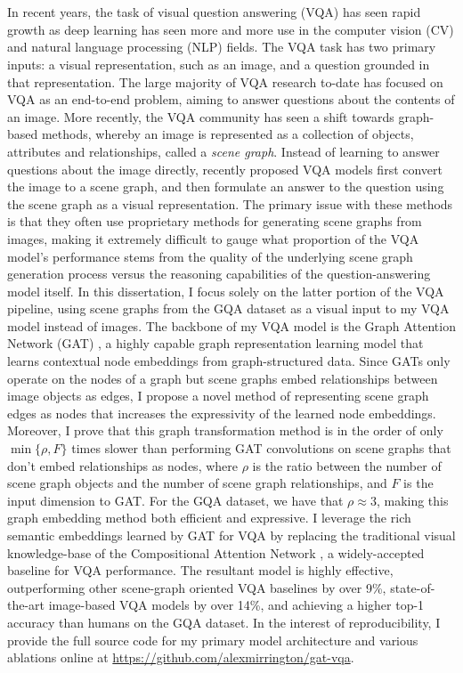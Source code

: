 \chapter*{}

In recent years, the task of visual question answering (VQA) has seen rapid growth as deep learning has seen more and more use in the computer vision (CV) and natural language processing (NLP) fields. The VQA task has two primary inputs: a visual representation, such as an image, and a question grounded in that representation. The large majority of VQA research to-date has focused on VQA as an end-to-end problem, aiming to answer questions about the contents of an image. More recently, the VQA community has seen a shift towards graph-based methods, whereby an image is represented as a collection of objects, attributes and relationships, called a \textit{scene graph}. Instead of learning to answer questions about the image directly, recently proposed VQA models first convert the image to a scene graph, and then formulate an answer to the question using the scene graph as a visual representation. The primary issue with these methods is that they often use proprietary methods for generating scene graphs from images, making it extremely difficult to gauge what proportion of the VQA model's performance stems from the quality of the underlying scene graph generation process versus the reasoning capabilities of the question-answering model itself. In this dissertation, I focus solely on the latter portion of the VQA pipeline, using scene graphs from the GQA dataset \cite{hudson2019gqa} as a visual input to my VQA model instead of images. The backbone of my VQA model is the Graph Attention Network (GAT) \cite{velivckovic2017graph}, a highly capable graph representation learning model that learns contextual node embeddings from graph-structured data. Since GATs only operate on the nodes of a graph but scene graphs embed relationships between image objects as edges, I propose a novel method of representing scene graph edges as nodes that increases the expressivity of the learned node embeddings. Moreover, I prove that this graph transformation method is in the order of only \(\min\{\rho, F\}\) times slower than performing GAT convolutions on scene graphs that don't embed relationships as nodes, where \(\rho\) is the ratio between the number of scene graph objects and the number of scene graph relationships, and \(F\) is the input dimension to GAT. For the GQA dataset, we have that \(\rho \approx 3\), making this graph embedding method both efficient and expressive. I leverage the rich semantic embeddings learned by GAT for VQA by replacing the traditional visual knowledge-base of the Compositional Attention Network \cite{hudson2018compositional}, a widely-accepted baseline for VQA performance. The resultant model is highly effective, outperforming other scene-graph oriented VQA baselines by over 9\%, state-of-the-art image-based VQA models by over 14\%, and achieving a higher top-1 accuracy than humans on the GQA dataset. In the interest of reproducibility, I provide the full source code for my primary model architecture and various ablations online at \url{https://github.com/alexmirrington/gat-vqa}.


